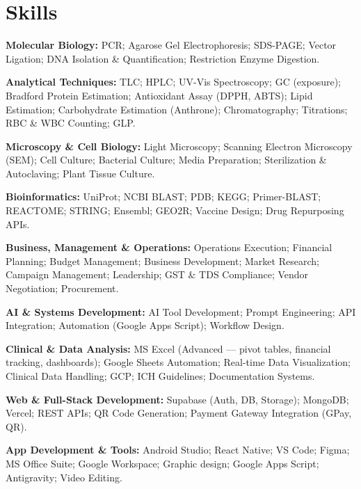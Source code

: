 \documentclass[10pt, a4paper]{article}
\begin{document}
\section{Skills}

\textbf{Molecular Biology:} PCR; Agarose Gel Electrophoresis; SDS-PAGE; Vector Ligation; DNA Isolation \& Quantification; Restriction Enzyme Digestion.

\vspace{3pt}
\textbf{Analytical Techniques:} TLC; HPLC; UV-Vis Spectroscopy; GC (exposure); Bradford Protein Estimation; Antioxidant Assay (DPPH, ABTS); Lipid Estimation; Carbohydrate Estimation (Anthrone); Chromatography; Titrations; RBC \& WBC Counting; GLP.

\vspace{3pt}
\textbf{Microscopy \& Cell Biology:} Light Microscopy; Scanning Electron Microscopy (SEM); Cell Culture; Bacterial Culture; Media Preparation; Sterilization \& Autoclaving; Plant Tissue Culture.

\vspace{3pt}
\textbf{Bioinformatics:} UniProt; NCBI BLAST; PDB; KEGG; Primer-BLAST; REACTOME; STRING; Ensembl; GEO2R; Vaccine Design; Drug Repurposing APIs.

\vspace{3pt}
\textbf{Business, Management \& Operations:} Operations Execution; Financial Planning; Budget Management; Business Development; Market Research; Campaign Management; Leadership; GST \& TDS Compliance; Vendor Negotiation; Procurement.

\vspace{3pt}
\textbf{AI \& Systems Development:} AI Tool Development; Prompt Engineering; API Integration; Automation (Google Apps Script); Workflow Design.

\vspace{3pt}
\textbf{Clinical \& Data Analysis:} MS Excel (Advanced --- pivot tables, financial tracking, dashboards); Google Sheets Automation; Real-time Data Visualization; Clinical Data Handling; GCP; ICH Guidelines; Documentation Systems.

\vspace{3pt}
\textbf{Web \& Full-Stack Development:} Supabase (Auth, DB, Storage); MongoDB; Vercel; REST APIs; QR Code Generation; Payment Gateway Integration (GPay, QR).

\vspace{3pt}
\textbf{App Development \& Tools:} Android Studio; React Native; VS Code; Figma; MS Office Suite; Google Workspace; Graphic design; Google Apps Script; Antigravity; Video Editing.
\end{document}
